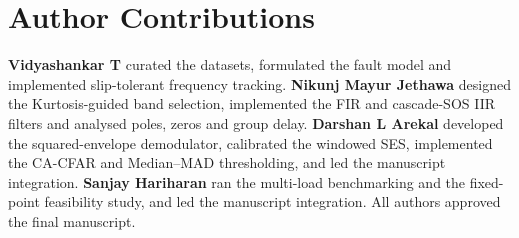 \section*{Author Contributions}
\textbf{Vidyashankar T} curated the datasets, formulated the fault model and
implemented slip-tolerant frequency tracking. \textbf{Nikunj Mayur Jethawa}
designed the Kurtosis-guided band selection, implemented the FIR and cascade-SOS
IIR filters and analysed poles, zeros and group delay. \textbf{Darshan L Arekal}
developed the squared-envelope demodulator, calibrated the windowed SES,
implemented the CA-CFAR and Median--MAD thresholding, and led the manuscript
integration. \textbf{Sanjay Hariharan} ran the multi-load benchmarking and the
fixed-point feasibility study, and led the manuscript integration. All authors
approved the final manuscript.
